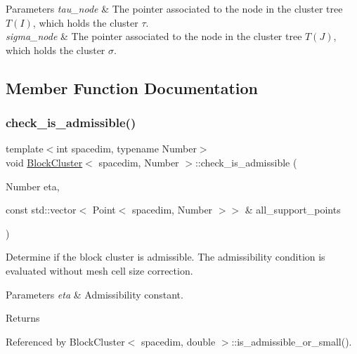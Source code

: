 \begin{DoxyParams}{Parameters}
{\em tau\+\_\+node} & The pointer associated to the node in the cluster tree $T(I)$, which holds the cluster $\tau$. \\
\hline
{\em sigma\+\_\+node} & The pointer associated to the node in the cluster tree $T(J)$, which holds the cluster $\sigma$. \\
\hline
\end{DoxyParams}


\subsection{Member Function Documentation}
\mbox{\label{classBlockCluster_a1f56a4b4d2c24fe8e78a954e13134ee1}} 
\subsubsection{\texorpdfstring{check\+\_\+is\+\_\+admissible()}{check\_is\_admissible()}\hspace{0.1cm}{\footnotesize\ttfamily [1/2]}}
{\footnotesize\ttfamily template$<$int spacedim, typename Number$>$ \\
void \hyperlink{classBlockCluster}{Block\+Cluster}$<$ spacedim, Number $>$\+::check\+\_\+is\+\_\+admissible (\begin{DoxyParamCaption}\item[{Number}]{eta,  }\item[{const std\+::vector$<$ Point$<$ spacedim, Number $>$$>$ \&}]{all\+\_\+support\+\_\+points }\end{DoxyParamCaption})}

Determine if the block cluster is admissible. The admissibility condition is evaluated without mesh cell size correction.


\begin{DoxyParams}{Parameters}
{\em eta} & Admissibility constant. \\
\hline
\end{DoxyParams}
\begin{DoxyReturn}{Returns}

\end{DoxyReturn}


Referenced by Block\+Cluster$<$ spacedim, double $>$\+::is\+\_\+admissible\+\_\+or\+\_\+small().


